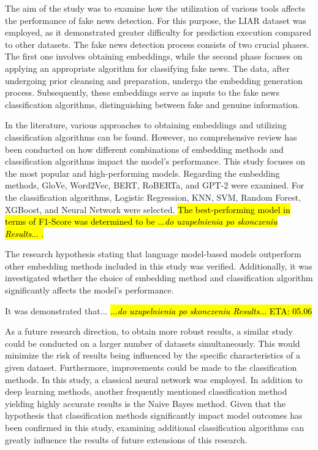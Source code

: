 The aim of the study was to examine how the utilization of various tools affects the performance of fake news detection. For this purpose, the LIAR dataset was employed, as it demonstrated greater difficulty for prediction execution compared to other datasets. The fake news detection process consists of two crucial phases. The first one involves obtaining embeddings, while the second phase focuses on applying an appropriate algorithm for classifying fake news. The data, after undergoing prior cleansing and preparation, undergo the embedding generation process. Subsequently, these embeddings serve as inputs to the fake news classification algorithms, distinguishing between fake and genuine information.

In the literature, various approaches to obtaining embeddings and utilizing classification algorithms can be found. However, no comprehensive review has been conducted on how different combinations of embedding methods and classification algorithms impact the model's performance. This study focuses on the most popular and high-performing models. Regarding the embedding methods, GloVe, Word2Vec, BERT, RoBERTa, and GPT-2 were examined. For the classification algorithms, Logistic Regression, KNN, SVM, Random Forest, XGBoost, and Neural Network were selected. \hl{The best-performing model in terms of F1-Score was determined to be ...\textit{do uzupelnienia po skonczeniu Results}... . }

The research hypothesis stating that language model-based models outperform other embedding methods included in this study was verified. Additionally, it was investigated whether the choice of embedding method and classification algorithm significantly affects the model's performance.

It was demonstrated that... \hl{...\textit{do uzupelnienia po skonczeniu Results}... ETA: 05.06}

As a future research direction, to obtain more robust results, a similar study could be conducted on a larger number of datasets simultaneously. This would minimize the risk of results being influenced by the specific characteristics of a given dataset. Furthermore, improvements could be made to the classification methods. In this study, a classical neural network was employed. In addition to deep learning methods, another frequently mentioned classification method yielding highly accurate results is the Naive Bayes method. Given that the hypothesis that classification methods significantly impact model outcomes has been confirmed in this study, examining additional classification algorithms can greatly influence the results of future extensions of this research.